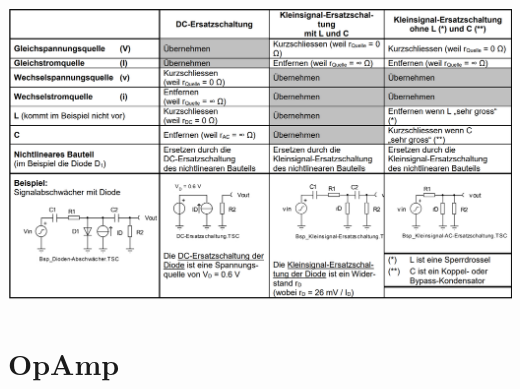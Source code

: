 \documentclass[margin=normal]{tex/hsrzf}
\begin{document}
\includegraphics[width = 15cm]{img/Tabelle Kleinsignal Ersatzschaltung.png}
\newpage
\section{OpAmp}
\end{document}
